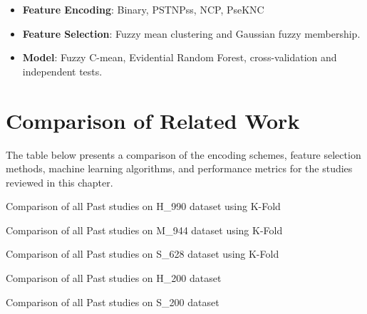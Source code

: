       \begin{itemize}
        \item \textbf{Feature Encoding}: Binary, PSTNPss, NCP, PseKNC
        \item \textbf{Feature Selection}: Fuzzy mean clustering and Gaussian fuzzy membership.
        \item \textbf{Model}: Fuzzy C-mean, Evidential Random Forest, cross-validation and independent tests.
      \end{itemize}


  \section{Comparison of Related Work}\label{sec:comparison-of-related-work}
    The table below presents a comparison of the encoding schemes, feature selection methods, machine learning algorithms, and performance metrics for the studies reviewed in this chapter.

    \begin{table}[h!]
      \centering
      
      \caption{Comparison of all Past studies on H\_990 dataset using K-Fold}
      \label{tab:human_comp_table}
    \end{table}

    \begin{table}[h!]
      \centering
      
      \caption{Comparison of all Past studies on M\_944 dataset using K-Fold}
      \label{tab:mouse_comp_table}
    \end{table}

    \begin{table}[h!]
      \centering
      
      \caption{Comparison of all Past studies on S\_628 dataset using K-Fold}
      \label{tab:yeast_comp_table}
    \end{table}

    \begin{table*}[h!]
      \centering
      
      \caption{Comparison of all Past studies on H\_200 dataset}
      \label{tab:human_indv_comp_table}
    \end{table*}

    \begin{table*}[h!]
      \centering
      
      \caption{Comparison of all Past studies on S\_200 dataset}
      \label{tab:yeast_indv_comp_table}
    \end{table*}
